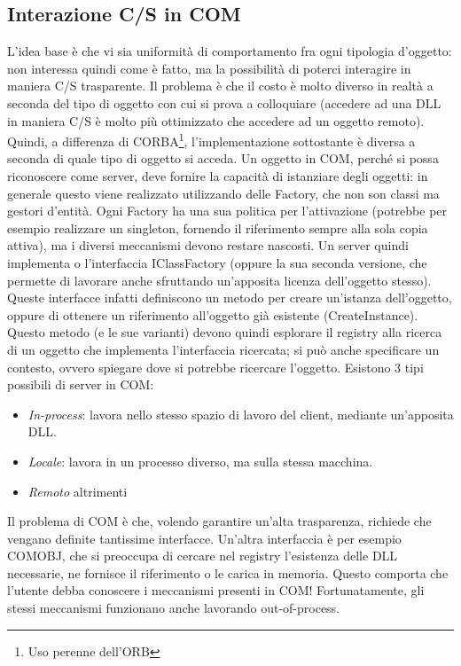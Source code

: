 \subsection{Interazione C/S in COM}
L'idea base è che vi sia uniformità di comportamento fra ogni tipologia d'oggetto: non interessa quindi come è fatto, ma 
la possibilità di poterci interagire in maniera C/S trasparente. Il problema è che il costo è molto diverso in realtà a
seconda del tipo di oggetto con cui si prova a colloquiare (accedere ad una DLL in maniera C/S è molto più ottimizzato 
che accedere ad un oggetto remoto).
Quindi, a differenza di CORBA\footnote{Uso perenne dell'ORB}, l'implementazione sottostante è diversa a seconda di quale 
tipo di oggetto si acceda. Un oggetto in COM, perché si possa riconoscere come server, deve fornire la capacità di 
istanziare degli oggetti: in generale questo viene realizzato utilizzando delle Factory, che non son classi ma gestori 
d'entità. Ogni Factory ha una sua politica per l'attivazione (potrebbe per esempio realizzare un singleton, fornendo il 
riferimento sempre alla sola copia attiva), ma i diversi meccanismi devono restare nascosti.
Un server quindi implementa o l'interfaccia IClassFactory (oppure la sua seconda versione, che permette di lavorare 
anche sfruttando un'apposita licenza dell'oggetto stesso). Queste interfacce infatti definiscono un metodo per creare 
un'istanza dell'oggetto, oppure di ottenere un riferimento all'oggetto già esistente (CreateInstance). Questo metodo (e 
le sue varianti) devono quindi esplorare il registry alla ricerca di un oggetto che implementa l'interfaccia ricercata; 
si può anche specificare un contesto, ovvero spiegare dove si potrebbe ricercare l'oggetto.
Esistono 3 tipi possibili di server in COM:
\begin{itemize}
 \item \textit{In-process}: lavora nello stesso spazio di lavoro del client, mediante un'apposita DLL.
 \item \textit{Locale}: lavora in un processo diverso, ma sulla stessa macchina.
 \item \textit{Remoto} altrimenti
\end{itemize}
Il problema di COM è che, volendo garantire un'alta trasparenza, richiede che vengano definite tantissime interfacce. 
Un'altra interfaccia è per esempio COMOBJ, che si preoccupa di cercare nel registry l'esistenza delle DLL necessarie,
ne fornisce il riferimento o le carica in memoria. Questo comporta che l'utente debba conoscere i meccanismi presenti
in COM! Fortunatamente, gli stessi meccanismi funzionano anche lavorando out-of-process.
